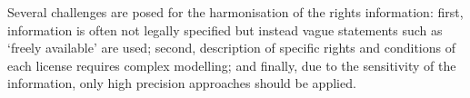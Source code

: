 \documentclass[11pt]{article}
\begin{document}
Several challenges are posed for the harmonisation of the rights information: first,
information is often not legally specified but instead vague
statements such as `freely available' are used; second, description
of specific rights and conditions of each license requires complex modelling; 
and finally, due to the sensitivity of the information, only high precision
approaches should be applied.
\end{document}
